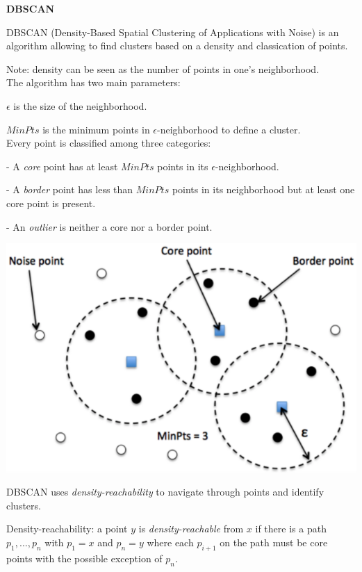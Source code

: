 {\fontsize{12pt}{22pt} \textbf{DBSCAN}\par}

\vspace{5mm}

DBSCAN (Density-Based Spatial Clustering of Applications with Noise) is an algorithm allowing to find clusters based on a density and classication of points. 

Note: density can be seen as the number of points in one's neighborhood. \\

The algorithm has two main parameters:

$\epsilon$ is the size of the neighborhood.

$MinPts$ is the minimum points in $\epsilon$-neighborhood to define a cluster.  \\

Every point is classified among three categories:

- A \textit{core} point has at least $MinPts$ points in its $\epsilon$-neighborhood.

- A \textit{border} point has less than $MinPts$ points in its neighborhood but at least one core point is present.

- An \textit{outlier} is neither a core nor a border point. \\

\begin{center}
\includegraphics[scale=0.3]{DBSCAN.png}
\end{center}

DBSCAN uses \textit{density-reachability} to navigate through points and identify clusters.

Density-reachability: a point $y$ is \textit{density-reachable} from $x$ if there is a path $p_1,..., p_n$ with $p_1=x$ and $p_n=y$ where each $p_{i+1}$ on the path must be core points with the possible exception of $p_n$. \\

